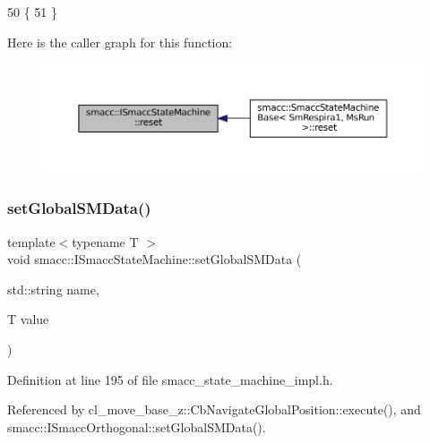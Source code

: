 \begin{DoxyCode}
50 \{
51 \}
\end{DoxyCode}
Here is the caller graph for this function\+:
\nopagebreak
\begin{figure}[H]
\begin{center}
\leavevmode
\includegraphics[width=350pt]{classsmacc_1_1ISmaccStateMachine_a9e4b4fe4dda962642397993235c6eea0_icgraph}
\end{center}
\end{figure}
\mbox{\label{classsmacc_1_1ISmaccStateMachine_a8588f9e580fbb95b53e2bd2ca3ff1f98}} 
\subsubsection{\texorpdfstring{set\+Global\+S\+M\+Data()}{setGlobalSMData()}}
{\footnotesize\ttfamily template$<$typename T $>$ \\
void smacc\+::\+I\+Smacc\+State\+Machine\+::set\+Global\+S\+M\+Data (\begin{DoxyParamCaption}\item[{std\+::string}]{name,  }\item[{T}]{value }\end{DoxyParamCaption})}



Definition at line 195 of file smacc\+\_\+state\+\_\+machine\+\_\+impl.\+h.



Referenced by cl\+\_\+move\+\_\+base\+\_\+z\+::\+Cb\+Navigate\+Global\+Position\+::execute(), and smacc\+::\+I\+Smacc\+Orthogonal\+::set\+Global\+S\+M\+Data().



